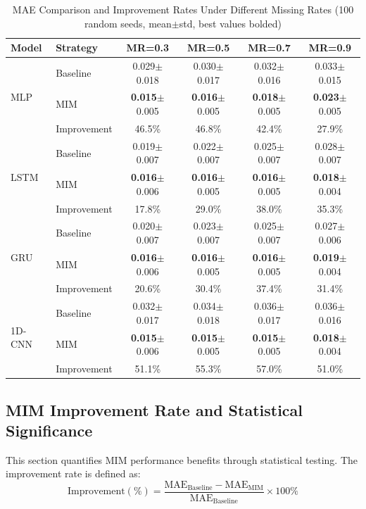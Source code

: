 \documentclass[10pt,a4paper]{article}
\begin{document}
\begin{table}[H]
\centering
\small
\caption{MAE Comparison and Improvement Rates Under Different Missing Rates (100 random seeds, mean$\pm$std, best values bolded)}
\label{tab:full_results}
\begin{tabular}{@{}llcccc@{}}
\toprule
\textbf{Model} & \textbf{Strategy} & \textbf{MR=0.3} & \textbf{MR=0.5} & \textbf{MR=0.7} & \textbf{MR=0.9} \\
\midrule
\multirow{3}{*}{MLP} 
& Baseline & 0.029$\pm$0.018 & 0.030$\pm$0.017 & 0.032$\pm$0.016 & 0.033$\pm$0.015 \\
& MIM & \textbf{0.015}$\pm$0.005 & \textbf{0.016}$\pm$0.005 & \textbf{0.018}$\pm$0.005 & \textbf{0.023}$\pm$0.005 \\
& Improvement & 46.5\% & 46.8\% & 42.4\% & 27.9\% \\
\midrule
\multirow{3}{*}{LSTM} 
& Baseline & 0.019$\pm$0.007 & 0.022$\pm$0.007 & 0.025$\pm$0.007 & 0.028$\pm$0.007 \\
& MIM & \textbf{0.016}$\pm$0.006 & \textbf{0.016}$\pm$0.005 & \textbf{0.016}$\pm$0.005 & \textbf{0.018}$\pm$0.004 \\
& Improvement & 17.8\% & 29.0\% & 38.0\% & 35.3\% \\
\midrule
\multirow{3}{*}{GRU} 
& Baseline & 0.020$\pm$0.007 & 0.023$\pm$0.007 & 0.025$\pm$0.007 & 0.027$\pm$0.006 \\
& MIM & \textbf{0.016}$\pm$0.006 & \textbf{0.016}$\pm$0.005 & \textbf{0.016}$\pm$0.005 & \textbf{0.019}$\pm$0.004 \\
& Improvement & 20.6\% & 30.4\% & 37.4\% & 31.4\% \\
\midrule
\multirow{3}{*}{1D-CNN} 
& Baseline & 0.032$\pm$0.017 & 0.034$\pm$0.018 & 0.036$\pm$0.017 & 0.036$\pm$0.016 \\
& MIM & \textbf{0.015}$\pm$0.006 & \textbf{0.015}$\pm$0.005 & \textbf{0.015}$\pm$0.005 & \textbf{0.018}$\pm$0.004 \\
& Improvement & 51.1\% & 55.3\% & 57.0\% & 51.0\% \\
\bottomrule
\end{tabular}
\end{table}

\subsection{MIM Improvement Rate and Statistical Significance}

This section quantifies MIM performance benefits through statistical testing. The improvement rate is defined as:
\begin{equation}
    \text{Improvement}(\%) = \frac{\text{MAE}_{\text{Baseline}} - \text{MAE}_{\text{MIM}}}{\text{MAE}_{\text{Baseline}}} \times 100\%
\end{equation}
\end{document}
